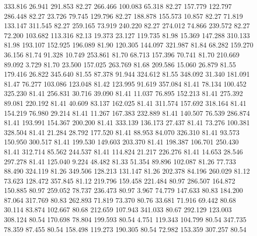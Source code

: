  333.816   26.941  291.853        82.27
 266.466  100.083   65.318        82.27
 157.779  122.797  286.448        82.27
  23.726   79.745  129.796        82.27
 188.878  155.573   10.857        82.27
  71.819  133.147  311.545        82.27
 259.165   73.919  240.220        82.27
 274.012   74.866  239.572        82.27
  72.200  103.682  113.316        82.13
  19.373   23.127  119.735        81.98
  15.369  147.288  310.133        81.98
 193.107  152.925  196.089        81.90
 120.305  144.097  321.987        81.84
  68.282  159.270   36.156        81.74
  91.328   10.749  253.861        81.70
  68.713  157.396   70.741        81.70
 210.669   89.092    3.729        81.70
  23.500  157.025  263.769        81.68
 209.586   15.060   26.879        81.55
 179.416   26.822  345.640        81.55
  87.378   91.944  324.612        81.55
 348.092   31.340  181.091        81.47
  76.277  103.086  123.048        81.42
 123.995   91.619  357.084        81.41
  78.134  100.452  325.230        81.41
 256.831   30.716   39.090        81.41
  11.037   76.895  152.213        81.41
 275.392   89.081  220.192        81.41
  40.609   83.137  162.025        81.41
 311.574  157.692  318.164        81.41
 154.219   76.980   29.214        81.41
  11.267  167.383  232.889        81.41
 140.507   76.539  286.874        81.41
 193.991  154.367  200.200        81.41
 333.139  136.173   27.437        81.41
  73.276  100.381  328.504        81.41
  21.284   28.792  177.520        81.41
  88.953   84.070  326.310        81.41
  93.573  150.950  300.517        81.41
 199.530  149.603  203.370        81.41
 198.387  106.701  250.430        81.41
 312.714   85.562  244.537        81.41
 114.824   21.217  226.276        81.41
  14.653   28.546  297.278        81.41
 125.040    9.224   48.482        81.33
  51.354   89.896  102.087        81.26
  77.733   88.490  324.119        81.26
 349.506  128.213  131.147        81.26
 202.378   84.196  260.029        81.12
  73.623  128.472  357.845        81.12
 219.796  159.458  221.484        80.97
 286.507  164.872  150.885        80.97
 259.052   78.737  236.473        80.97
   3.967   74.779  147.633        80.83
 184.200   87.064  317.769        80.83
 262.893   71.819   73.370        80.76
  33.681   71.916   69.442        80.68
  30.114   83.874  102.667        80.68
 212.659  107.943  341.033        80.67
 292.129  123.003  308.124        80.54
 170.698   78.804  199.593        80.54
   4.751  119.343  104.799        80.54
 347.735   78.359   87.455        80.54
 158.498  119.273  190.305        80.54
  72.982  153.359  307.257        80.54
